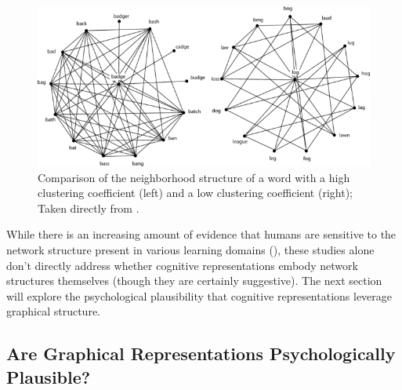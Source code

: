 \documentclass[12pt]{article}
\let\oldcite=\cite
\let\oldtextcite=\textcite
\renewcommand{\cite}[1]{\textcolor[rgb]{0, .121, .388}{\oldcite{#1}}}
\renewcommand{\textcite}[1]{\textcolor[rgb]{0, .121, .388}{\oldtextcite{#1}}}
\begin{document}
\begin{figure}[h]
    \centering
    \label{fig:chan2010network-figure}
    \includegraphics[scale=.6]{figures/chan2010network-figure.png}
    \caption{Comparison of the neighborhood structure of a word with a high clustering coefficient (left) and a low clustering coefficient (right); Taken directly from \emph{\textcite{chan2010network}}.}
\end{figure} 

While there is an increasing amount of evidence that humans are sensitive to the network structure present in various learning domains (\cite{saffran1996word,karuza2019human,karuza2017process,kahn2018network,vitevitch2012complex,chan2009influence,chan2010network}), these studies alone don't directly address whether cognitive representations embody network structures themselves (though they are certainly suggestive). The next section will explore the psychological plausibility that cognitive representations leverage graphical structure.


\subsection{Are Graphical Representations Psychologically Plausible?}
\end{document}
